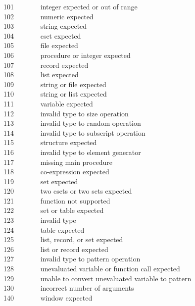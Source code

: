 101 \ \ \ \ \ \ \ integer expected or out of range\\
102 \ \ \ \ \ \ \ numeric expected\\
103 \ \ \ \ \ \ \ string expected\\
104 \ \ \ \ \ \ \ cset expected\\
105 \ \ \ \ \ \ \ file expected\\
106 \ \ \ \ \ \ \ procedure or integer expected\\
107 \ \ \ \ \ \ \ record expected\\
108 \ \ \ \ \ \ \ list expected\\
109 \ \ \ \ \ \ \ string or file expected\\
110 \ \ \ \ \ \ \ string or list expected\\
111 \ \ \ \ \ \ \ variable expected\\
112 \ \ \ \ \ \ \ invalid type to size operation\\
113 \ \ \ \ \ \ \ invalid type to random operation\\
114 \ \ \ \ \ \ \ invalid type to subscript operation\\
115 \ \ \ \ \ \ \ structure expected\\
116 \ \ \ \ \ \ \ invalid type to element generator\\
117 \ \ \ \ \ \ \ missing main procedure\\
118 \ \ \ \ \ \ \ co-expression expected\\
119 \ \ \ \ \ \ \ set expected\\
120 \ \ \ \ \ \ \ two csets or two sets expected\\
121 \ \ \ \ \ \ \ function not supported\\
122 \ \ \ \ \ \ \ set or table expected\\
123 \ \ \ \ \ \ \ invalid type\\
124 \ \ \ \ \ \ \ table expected\\
125 \ \ \ \ \ \ \ list, record, or set expected\\
126 \ \ \ \ \ \ \ list or record expected\\
127 \ \ \ \ \ \ \ invalid type to pattern operation\\
128 \ \ \ \ \ \ \ unevaluated variable or function call expected\\
129 \ \ \ \ \ \ \ unable to convert unevaluated variable to pattern\\
130 \ \ \ \ \ \ \ incorrect number of arguments\\
140 \ \ \ \ \ \ \ window expected\\
